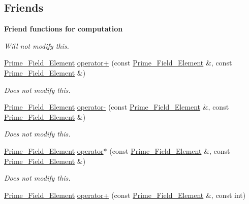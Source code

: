 \subsection*{Friends}
\begin{Indent}\textbf{ Friend functions for computation}\par
{\em Will not modify {\ttfamily this}. }\begin{DoxyCompactItemize}
\item 
\hyperlink{class_prime___field___element}{Prime\+\_\+\+Field\+\_\+\+Element} \hyperlink{class_prime___field___element_af379d31756ccc09650e204aaa7dc1dd2}{operator+} (const \hyperlink{class_prime___field___element}{Prime\+\_\+\+Field\+\_\+\+Element} \&, const \hyperlink{class_prime___field___element}{Prime\+\_\+\+Field\+\_\+\+Element} \&)
\begin{DoxyCompactList}\small\item\em Does not modify {\ttfamily this}. \end{DoxyCompactList}\item 
\hyperlink{class_prime___field___element}{Prime\+\_\+\+Field\+\_\+\+Element} \hyperlink{class_prime___field___element_aa87409f200d39343529ab443cd496b31}{operator-\/} (const \hyperlink{class_prime___field___element}{Prime\+\_\+\+Field\+\_\+\+Element} \&, const \hyperlink{class_prime___field___element}{Prime\+\_\+\+Field\+\_\+\+Element} \&)
\begin{DoxyCompactList}\small\item\em Does not modify {\ttfamily this}. \end{DoxyCompactList}\item 
\hyperlink{class_prime___field___element}{Prime\+\_\+\+Field\+\_\+\+Element} \hyperlink{class_prime___field___element_a33507738ef00abb43ae64c900f7b807a}{operator$\ast$} (const \hyperlink{class_prime___field___element}{Prime\+\_\+\+Field\+\_\+\+Element} \&, const \hyperlink{class_prime___field___element}{Prime\+\_\+\+Field\+\_\+\+Element} \&)
\begin{DoxyCompactList}\small\item\em Does not modify {\ttfamily this}. \end{DoxyCompactList}\item 
\mbox{\label{class_prime___field___element_aeaa863df01035eb31f147cfe7194e8e1}} 
\hyperlink{class_prime___field___element}{Prime\+\_\+\+Field\+\_\+\+Element} \hyperlink{class_prime___field___element_aeaa863df01035eb31f147cfe7194e8e1}{operator+} (const \hyperlink{class_prime___field___element}{Prime\+\_\+\+Field\+\_\+\+Element} \&, const int)

\end{DoxyCompactItemize}
\end{Indent}
